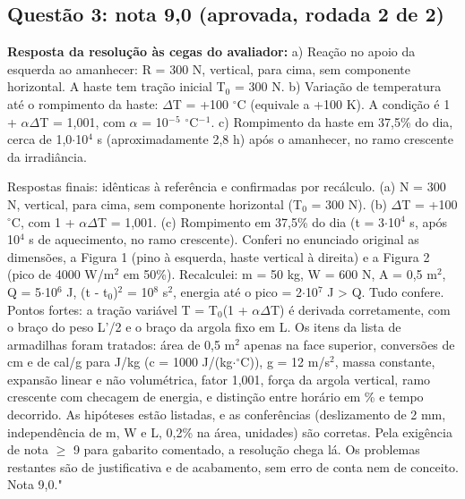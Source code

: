 \documentclass{article}%
\begin{document}
\subsection*{Questão 3: nota 9,0 (aprovada, rodada 2 de 2)}%
\textbf{Resposta da resolução às cegas do avaliador:} a) Reação no apoio da esquerda ao amanhecer: R = 300 N, vertical, para cima, sem componente horizontal. A haste tem tração inicial T$_{0}$ = 300 N.\newline%
\newline%
b) Variação de temperatura até o rompimento da haste: $\Delta$T = +100 $^\circ$C (equivale a +100 K). A condição é 1 + $\alpha$$\Delta$T = 1,001, com $\alpha$ = 10$^{-}$$^{5}$ $^\circ$C$^{-}$$^{1}$.\newline%
\newline%
c) Rompimento da haste em 37,5\% do dia, cerca de 1,0$\cdot$10$^{4}$ s (aproximadamente 2,8 h) após o amanhecer, no ramo crescente da irradiância.\par %
Respostas finais: idênticas à referência e confirmadas por recálculo. (a) N = 300 N, vertical, para cima, sem componente horizontal (T$_{0}$ = 300 N). (b) $\Delta$T = +100 $^\circ$C, com 1 + $\alpha$$\Delta$T = 1,001. (c) Rompimento em 37,5\% do dia (t = 3$\cdot$10$^{4}$ s, após 10$^{4}$ s de aquecimento, no ramo crescente). Conferi no enunciado original as dimensões, a Figura 1 (pino à esquerda, haste vertical à direita) e a Figura 2 (pico de 4000 W/m$^2$ em 50\%). Recalculei: m = 50 kg, W = 600 N, A = 0,5 m$^2$, Q = 5$\cdot$10$^{6}$ J, (t - t$_{0}$)$^2$ = 10$^{8}$ s$^2$, energia até o pico = 2$\cdot$10$^{7}$ J > Q. Tudo confere.\newline%
\newline%
Pontos fortes: a tração variável T = T$_{0}$(1 + $\alpha$$\Delta$T) é derivada corretamente, com o braço do peso L'/2 e o braço da argola fixo em L. Os itens da lista de armadilhas foram tratados: área de 0,5 m$^2$ apenas na face superior, conversões de cm e de cal/g para J/kg (c = 1000 J/(kg$\cdot$$^\circ$C)), g = 12 m/s$^2$, massa constante, expansão linear e não volumétrica, fator 1,001, força da argola vertical, ramo crescente com checagem de energia, e distinção entre horário em \% e tempo decorrido. As hipóteses estão listadas, e as conferências (deslizamento de 2 mm, independência de m, W e L, 0,2\% na área, unidades) são corretas.\newline%
\newline%
Pela exigência de nota $\geq$ 9 para gabarito comentado, a resolução chega lá. Os problemas restantes são de justificativa e de acabamento, sem erro de conta nem de conceito. Nota 9,0."%
\end{document}
